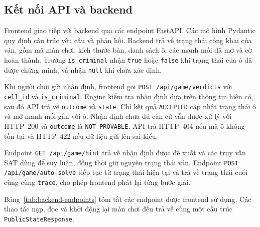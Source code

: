 \subsection{Kết nối API và backend}
Frontend giao tiếp với backend qua các endpoint FastAPI. Các mô hình
Pydantic quy định cấu trúc yêu cầu và phản hồi. Backend trả về trạng
thái công khai của ván, gồm mã màn chơi, kích thước bàn, danh sách ô,
các manh mối đã mở và cờ hoàn thành. Trường \texttt{is\_criminal}
nhận \texttt{true} hoặc \texttt{false} khi trạng thái của ô đã được
chứng minh, và nhận \texttt{null} khi chưa xác định.

Khi người chơi gửi nhận định, frontend gọi
\nolinkurl{POST /api/game/verdicts} với \texttt{cell\_id} và
\texttt{is\_criminal}. Engine kiểm tra nhận định dựa trên thông tin
hiện có, sau đó API trả về \texttt{outcome} và \texttt{state}.
Chỉ kết quả \texttt{ACCEPTED} cập nhật trạng thái ô và mở manh mối
gắn với ô. Nhận định chưa đủ căn cứ vẫn được xử lý với HTTP~200 và
\texttt{outcome} là \texttt{NOT\_PROVABLE}. API trả HTTP~404 nếu
mã ô không tồn tại và HTTP~422 nếu dữ liệu gửi lên sai kiểu.

Endpoint \nolinkurl{GET /api/game/hint} trả về nhận định được đề xuất
và các truy vấn SAT dùng để suy luận, đồng thời giữ nguyên trạng
thái ván. Endpoint \nolinkurl{POST /api/game/auto-solve} tiếp tục
từ trạng thái hiện tại và trả về trạng thái cuối cùng cùng
\texttt{trace}, cho phép frontend phát lại từng bước giải.

Bảng~\ref{tab:backend-endpoints} tóm tắt các endpoint được frontend
sử dụng. Các thao tác nạp, đọc và khởi động lại màn chơi đều trả
về cùng một cấu trúc \texttt{PublicStateResponse}.

